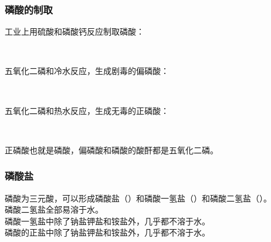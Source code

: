 \documentclass[UTF8]{ctexart}
\begin{document}
\subsubsection{磷酸的制取}
    工业上用硫酸和磷酸钙反应制取磷酸：
    \begin{center}
        \\[6mm]
    \end{center}
    五氧化二磷和冷水反应，生成剧毒的偏磷酸：
    \begin{center}
        \\[6mm]
    \end{center}
    五氧化二磷和热水反应，生成无毒的正磷酸：
    \begin{center}
        \\[6mm]
    \end{center}
    正磷酸也就是磷酸，偏磷酸和磷酸的酸酐都是五氧化二磷。

\subsubsection{磷酸盐}
    磷酸为三元酸，可以形成磷酸盐（）和磷酸一氢盐（）和磷酸二氢盐（）。\\[3mm]
    磷酸二氢盐全部易溶于水。\\[3mm]
    磷酸一氢盐中除了钠盐钾盐和铵盐外，几乎都不溶于水。\\[3mm]
    磷酸的正盐中除了钠盐钾盐和铵盐外，几乎都不溶于水。

\newpage
\end{document}
